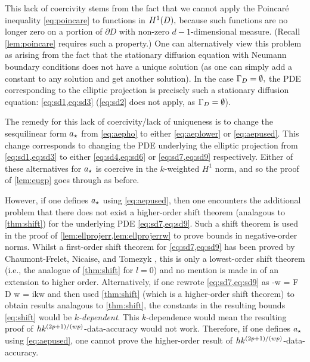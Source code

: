 This lack of coercivity stems from the fact that we cannot apply the Poincar\'e inequality \cref{eq:poincare} to functions in $\HoD,$ because such functions are no longer zero on a portion of $\partial D$ with non-zero $d-1$-dimensional measure. (Recall \cref{lem:poincare} requires such a property.) One can alternatively view this problem as arising from the fact that the stationary diffusion equation with Neumann boundary conditions does not have a unique solution (as one can simply add a constant to any solution and get another solution). In the case $\Gamma_{D}=\emptyset,$ the PDE corresponding to the elliptic projection is precisely such a stationary diffusion equation: \cref{eq:sd1,eq:sd3} (\cref{eq:sd2} does not apply, as $\Gamma_{D} = \emptyset$).

The remedy for this lack of coercivity/lack of uniqueness is to change the sesquilinear form $a_{\star}$ from \cref{eq:aepho} to either \cref{eq:aeplower} or \cref{eq:aepused}. This change corresponds to changing the PDE underlying the elliptic projection from \cref{eq:sd1,eq:sd3} to either \cref{eq:sd4,eq:sd6} or \cref{eq:sd7,eq:sd9} respectively. Either of these alternatives for $a_{\star}$ is coercive in the $k$-weighted $H^1$ norm, and so the proof of \cref{lem:eugp} goes through as before.

However, if one defines $a_{\star}$ using \cref{eq:aepused}, then one encounters the additional problem that there does not exist a higher-order shift theorem (analagous to \cref{thm:shift}) for the underlying PDE \cref{eq:sd7,eq:sd9}. Such a shift theorem is used in the proof of \cref{lem:ellprojerr,lem:ellprojerrw} to prove bounds in negative-order norms. Whilst a first-order shift theorem for \cref{eq:sd7,eq:sd9}  has been proved by Chaumont-Frelet, Nicaise, and Tomezyk \cite[Theorems 3.1, 4.3, and 5.1]{ChNiTo:18}, this is only a lowest-order shift theorem (i.e., the analogue of \cref{thm:shift} for $l=0$) and no mention is made in \cite{ChNiTo:18} of an extension to higher order. Alternatively, if one rewrote \cref{eq:sd7,eq:sd9} as
\beqs
-\Delta w = F  \tin D \tand
\eeqs
\beqs
\dn w = ikw \ton \GI
\eeqs
and then used \cref{thm:shift} (which is a higher-order shift theorem) to obtain results analagous to \cref{thm:shift}, the constants in the resulting bounds \cref{eq:shift} would be \emph{$k$-dependent}. This $k$-dependence would mean the resulting proof of $hk^{(2p+1)/(wp)}$-data-accuracy would not work. Therefore, if one defines $a_{\star}$ using \cref{eq:aepused}, one cannot prove the higher-order result of $hk^{(2p+1)/(wp)}$-data-accuracy.

